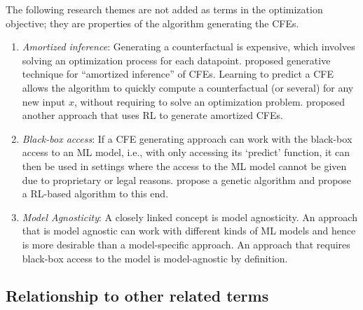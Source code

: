     The following research themes are not added as terms in the optimization objective; they are properties of the algorithm generating the CFEs. 
    
    \begin{enumerate}[resume]
    \item \textit{Amortized inference}: Generating a counterfactual is expensive, which involves solving an optimization process for each datapoint. 
    \citet{mahajan_preserving_2020} proposed generative technique for ``amortized inference'' of CFEs. Learning to predict a CFE allows the algorithm to quickly compute a counterfactual (or several) for any new input $x$, without requiring to solve an optimization problem. \citet{verma2021amortized} proposed another approach that uses RL to generate amortized CFEs. 
    
    \item \textit{Black-box access}: If a CFE generating approach can work with the black-box access to an ML model, i.e., with only accessing its `predict' function, it can then be used in settings where the access to the ML model cannot be given due to proprietary or legal reasons. \citet{dandl_multi-objective_2020} propose a genetic algorithm and \citet{verma2021amortized} propose a RL-based algorithm to this end. 
    
    \item \textit{Model Agnosticity}: A closely linked concept is model agnosticity. An approach that is model agnostic can work with different kinds of ML models and hence is more desirable than a model-specific approach. An approach that requires black-box access to the model is model-agnostic by definition. 
    
    
\end{enumerate}


\subsection{Relationship to other related terms} 

